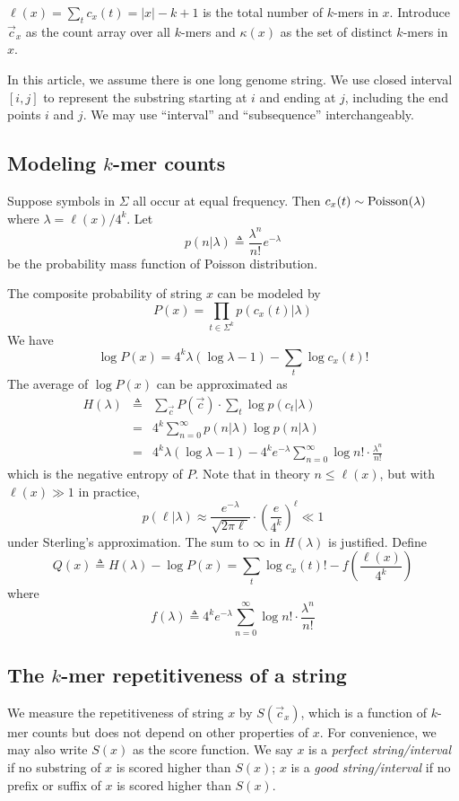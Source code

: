 \documentclass[webpdf,contemporary,large,namedate]{oup-authoring-template}%
\begin{document}
$\ell(x)=\sum_t c_x(t)=|x|-k+1$ is the total number of $k$-mers in $x$.
Introduce $\vec{c}_x$ as the count array over all $k$-mers
and $\kappa(x)$ as the set of distinct $k$-mers in $x$.

In this article, we assume there is one long genome string.
We use closed interval $[i,j]$ to represent the substring starting at $i$
and ending at $j$, including the end points $i$ and $j$.
We may use ``interval'' and ``subsequence'' interchangeably.

\subsection{Modeling $k$-mer counts}

Suppose symbols in $\Sigma$ all occur at equal frequency.
Then $c_x(t)\sim{\rm Poisson}(\lambda)$ where $\lambda=\ell(x)/4^k$.
Let
$$
p(n|\lambda)\triangleq\frac{\lambda^n}{n!}e^{-\lambda}
$$
be the probability mass function of Poisson distribution.

The composite probability of string $x$ can be modeled by
$$
P(x)=\prod_{t\in\Sigma^k}p(c_x(t)|\lambda)
$$
We have
$$
\log P(x)=4^k\lambda(\log\lambda-1)-\sum_t\log c_x(t)!
$$
The average of $\log P(x)$ can be approximated as
\begin{eqnarray*}
H(\lambda)&\triangleq&\sum_{\vec{c}}P(\vec{c})\cdot\sum_t\log p(c_t|\lambda)\\
&=&4^k\sum_{n=0}^{\infty}p(n|\lambda)\log p(n|\lambda)\\
&=&4^k\lambda(\log\lambda-1)-4^ke^{-\lambda}\sum_{n=0}^{\infty}\log n!\cdot\frac{\lambda^n}{n!}
\end{eqnarray*}
which is the negative entropy of $P$. Note that in theory $n\le\ell(x)$,
but with $\ell(x)\gg1$ in practice,
$$
p(\ell|\lambda)\approx\frac{e^{-\lambda}}{\sqrt{2\pi\ell}}\cdot\left(\frac{e}{4^k}\right)^{\ell}\ll 1
$$
under Sterling's approximation.
The sum to $\infty$ in $H(\lambda)$ is justified.
Define
$$
Q(x)\triangleq H(\lambda)-\log P(x)=\sum_t\log c_x(t)!-f\left(\frac{\ell(x)}{4^k}\right)
$$
where
$$
f(\lambda)\triangleq4^ke^{-\lambda}\sum_{n=0}^\infty\log n!\cdot\frac{\lambda^n}{n!}
$$

\subsection{The $k$-mer repetitiveness of a string}

We measure the repetitiveness of string $x$ by $S(\vec{c}_x)$,
which is a function of $k$-mer counts but does not depend on other properties of $x$.
For convenience, we may also write $S(x)$ as the score function.
We say $x$ is a \emph{perfect string/interval} if no substring of $x$ is scored higher than $S(x)$;
$x$ is a \emph{good string/interval} if no prefix or suffix of $x$ is scored higher than $S(x)$.
\end{document}
